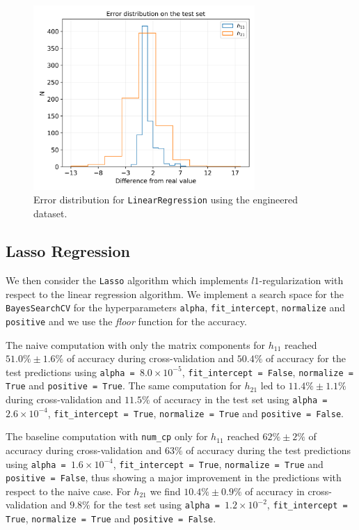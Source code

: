     \begin{figure}[t]
        \centering
        \includegraphics[width=0.75\textwidth]{tex/img/lin_reg_error_eng.png}
        \caption{Error distribution for \texttt{LinearRegression} using the engineered dataset.}
        \label{fig:lin_reg_err}
    \end{figure}
    
\subsection{Lasso Regression}
    We then consider the \texttt{Lasso} algorithm which implements $l1$-regularization with respect to the linear regression algorithm. We implement a search space for the \texttt{BayesSearchCV} for the hyperparameters \texttt{alpha}, \texttt{fit\_intercept}, \texttt{normalize} and \texttt{positive} and we use the \textit{floor} function for the accuracy.
    
    The naive computation with only the matrix components for $h_{11}$ reached $51.0\% \pm 1.6\%$ of accuracy during cross-validation and $50.4\%$ of accuracy for the test predictions using \texttt{alpha = $8.0 \times 10^{-5}$}, \texttt{fit\_intercept = False}, \texttt{normalize = True} and \texttt{positive = True}. The same computation for $h_{21}$ led to $11.4\% \pm 1.1\%$ during cross-validation and $11.5\%$ of accuracy in the test set using \texttt{alpha = $2.6 \times 10^{-4}$}, \texttt{fit\_intercept = True}, \texttt{normalize = True} and \texttt{positive = False}.
    
    The baseline computation with \texttt{num\_cp} only for $h_{11}$ reached $62\% \pm 2\%$ of accuracy during cross-validation and $63\%$ of accuracy during the test predictions using \texttt{alpha = $1.6 \times 10^{-4}$}, \texttt{fit\_intercept = True}, \texttt{normalize = True} and \texttt{positive = False}, thus showing a major improvement in the predictions with respect to the naive case. For $h_{21}$ we find $10.4\% \pm 0.9\%$ of accuracy in cross-validation and $9.8\%$ for the test set using \texttt{alpha = $1.2 \times 10^{-2}$}, \texttt{fit\_intercept = True}, \texttt{normalize = True} and \texttt{positive = False}.
    
